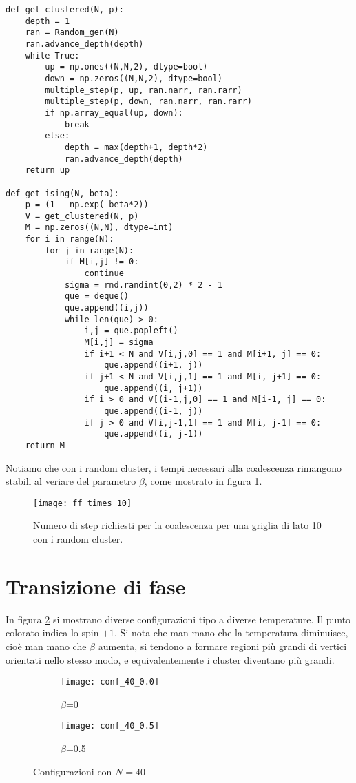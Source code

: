 \documentclass[]{marticle}
\begin{document}
\begin{lstlisting}
def get_clustered(N, p):
    depth = 1
    ran = Random_gen(N)
    ran.advance_depth(depth)
    while True:
        up = np.ones((N,N,2), dtype=bool)
        down = np.zeros((N,N,2), dtype=bool)
        multiple_step(p, up, ran.narr, ran.rarr)
        multiple_step(p, down, ran.narr, ran.rarr)
        if np.array_equal(up, down):
            break
        else:
            depth = max(depth+1, depth*2)
            ran.advance_depth(depth)
    return up

def get_ising(N, beta):
    p = (1 - np.exp(-beta*2))
    V = get_clustered(N, p)
    M = np.zeros((N,N), dtype=int)
    for i in range(N):
        for j in range(N):
            if M[i,j] != 0:
                continue
            sigma = rnd.randint(0,2) * 2 - 1
            que = deque()
            que.append((i,j))
            while len(que) > 0:
                i,j = que.popleft()
                M[i,j] = sigma
                if i+1 < N and V[i,j,0] == 1 and M[i+1, j] == 0:
                    que.append((i+1, j))
                if j+1 < N and V[i,j,1] == 1 and M[i, j+1] == 0:
                    que.append((i, j+1))
                if i > 0 and V[(i-1,j,0] == 1 and M[i-1, j] == 0:
                    que.append((i-1, j))
                if j > 0 and V[i,j-1,1] == 1 and M[i, j-1] == 0:
                    que.append((i, j-1))
    return M
\end{lstlisting}

Notiamo che con i random cluster, i tempi necessari alla coalescenza rimangono
stabili al veriare del parametro $\beta$, come mostrato in figura
\ref{fig:plot2}.

\begin{figure}[]
\texttt{[image: ff\_times\_10]}
\caption{Numero di step richiesti per la coalescenza per una griglia di lato 10
    con i random cluster.}
\label{fig:plot2}
\centering
\end{figure}

\section{Transizione di fase} In figura \ref{fig:plot3} si mostrano diverse
configurazioni tipo a diverse temperature. Il punto colorato indica lo spin
$+1$. Si nota che man mano che la temperatura diminuisce, cio\`e man mano che
$\beta$ aumenta, si tendono a formare regioni pi\`u grandi di vertici orientati
nello stesso modo, e equivalentemente i cluster diventano pi\`u grandi. 

\begin{figure}[]
\begin{subfigure}{.5\textwidth}
  \centering
  \texttt{[image: conf\_40\_0.0]}
  \caption{$\beta$=0}
\end{subfigure}%
\begin{subfigure}{.5\textwidth}
  \centering
  \texttt{[image: conf\_40\_0.5]}
  \caption{$\beta$=0.5}
\end{subfigure}%
\caption{Configurazioni con $N=40$}
\label{fig:plot3}
\centering
\end{figure}
\end{document}
